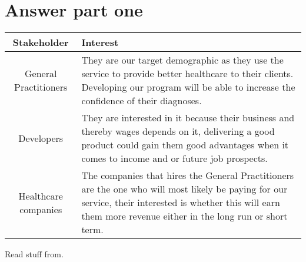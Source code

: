 \section{Answer part one}
\begin{center}
	\begin{tabular}[h]{|c|p{25em}|}
		\hline
		Stakeholder & Interest \\ \hline
		General Practitioners & They are our target demographic as they use the service to provide better healthcare to their clients. Developing our program will be able to increase the confidence of their diagnoses. \\ \hline
		Developers & They are interested in it because their business and thereby wages depends on it, delivering a good product could gain them good advantages when it comes to income and or future job prospects. \\ \hline
		Healthcare companies & The companies that hires the General Practitioners are the one who will most likely be paying for our service, their interested is whether this will earn them more revenue either in the long run or short term.\\ \hline
	\end{tabular}
\end{center}








Read stuff from\cite{Larson2021}.
